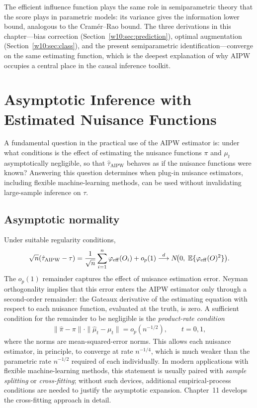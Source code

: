 \documentclass[master.tex]{subfiles}
\begin{document}
\begin{remark}
\label{w10:rem:eif-as-score}
The efficient influence function plays the same role in semiparametric
theory that the score plays in parametric models: its variance gives
the information lower bound, analogous to the Cramér--Rao bound.
The three derivations in this chapter---bias correction
(Section~\ref{w10:sec:prediction}), optimal augmentation
(Section~\ref{w10:sec:class}), and the present semiparametric
identification---converge on the same estimating function, which is
the deepest explanation of why AIPW occupies a central place in the
causal inference toolkit.
\end{remark}

\section{Asymptotic Inference with Estimated Nuisance Functions}
\label{w10:sec:asymp}

A fundamental question in the practical use of the AIPW estimator
is: under what conditions is the effect of estimating the nuisance
functions $\pi$ and $\mu_t$ asymptotically negligible, so that
$\hat\tau_{\mathrm{AIPW}}$ behaves as if the nuisance functions were
known?  Answering this question determines when plug-in nuisance
estimators, including flexible machine-learning methods, can be used
without invalidating large-sample inference on $\tau$.

\subsection{Asymptotic normality}
\label{w10:subsec:asymp-normality}

Under suitable regularity conditions,
\[
  \sqrt{n}(\hat\tau_{\mathrm{AIPW}}-\tau)
  = \frac{1}{\sqrt{n}}\sum_{i=1}^n\varphi_{\mathrm{eff}}(O_i)
    + o_p(1)
  \overset{d}{\longrightarrow}
  N\!\bigl(0,\;\mathbb{E}\{\varphi_{\mathrm{eff}}(O)^2\}\bigr).
\]
The $o_p(1)$ remainder captures the effect of nuisance estimation
error.  Neyman orthogonality implies that this error enters the AIPW
estimator only through a second-order remainder: the Gateaux
derivative of the estimating equation with respect to each nuisance
function, evaluated at the truth, is zero.  A sufficient condition
for the remainder to be negligible is the \emph{product-rate
condition}
\begin{align}
  \|\hat\pi-\pi\|\cdot\|\hat\mu_t-\mu_t\| = o_p(n^{-1/2}),
  \qquad t=0,1,
  \label{w10:eq:product-rate}
\end{align}
where the norms are mean-squared-error norms.  This allows each
nuisance estimator, in principle, to converge at rate $n^{-1/4}$,
which is much weaker than the parametric rate $n^{-1/2}$ required of
each individually.  In modern applications with flexible
machine-learning methods, this statement is usually paired with
\emph{sample splitting} or \emph{cross-fitting}; without such
devices, additional empirical-process conditions are needed to justify
the asymptotic expansion.  Chapter~11 develops the cross-fitting
approach in detail.
\end{document}
